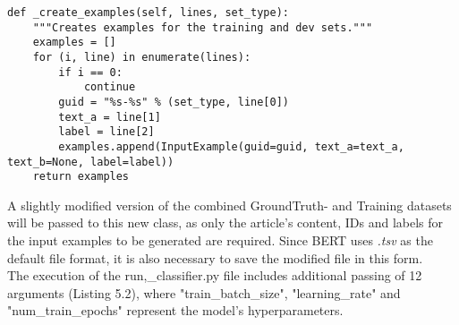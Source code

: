 \documentclass[a4paper, 11pt,titlepage,oneside,openany]{book}
\begin{document}
\begin{lstlisting}[caption=Create\_examples in BERT]
def _create_examples(self, lines, set_type):
    """Creates examples for the training and dev sets."""
    examples = []
    for (i, line) in enumerate(lines):
        if i == 0:
            continue
        guid = "%s-%s" % (set_type, line[0])
        text_a = line[1]
        label = line[2]
        examples.append(InputExample(guid=guid, text_a=text_a, text_b=None, label=label))
    return examples
\end{lstlisting}
\indent A slightly modified version of the combined GroundTruth- and Training datasets will be passed to this new class, as only the article's content, IDs and labels for the input examples to be generated are required. Since BERT uses \textit{.tsv} as the default file format, it is also necessary to save the modified file in this form. \\
\noindent The execution of the run,\_classifier.py file includes additional passing of 12 arguments (Listing 5.2), where "train\_batch\_size", "learning\_rate" and "num\_train\_epochs" represent the model's hyperparameters. 
\end{document}
